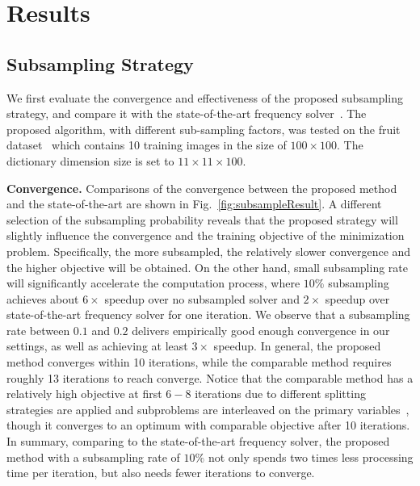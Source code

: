 \section{Results} \label{sec:result}
\subsection{Subsampling Strategy}
We first evaluate the convergence and effectiveness of the proposed subsampling strategy, and compare it with the state-of-the-art frequency solver~\cite{heide2015fast}. The proposed algorithm, with different sub-sampling factors, was tested on the fruit dataset~\cite{zeiler2010deconvolutional} which contains 10 training images in the size of $100 \times 100$. The dictionary dimension size is set to $11 \times 11 \times 100$.

{\bfseries Convergence.} Comparisons of the convergence between the proposed method and the state-of-the-art are shown in Fig.~\ref{fig:subsampleResult}. A different selection of the subsampling probability reveals that the proposed strategy will slightly influence the convergence and the training objective of the minimization problem. Specifically, the more subsampled, the relatively slower convergence and the higher objective will be obtained. On the other hand, small subsampling rate will significantly accelerate the computation process, where $10\%$ subsampling achieves about $6 \times$ speedup over no subsampled solver and $2 \times$ speedup over state-of-the-art frequency solver for one iteration. We observe that a subsampling rate between $0.1$ and $0.2$ delivers empirically good enough convergence in our settings, as well as achieving at least $3 \times$ speedup. In general, the proposed method converges within 10 iterations, while the comparable method requires roughly 13 iterations to reach converge. Notice that the comparable method has a relatively high objective at first $6-8$ iterations due to different splitting strategies are applied and subproblems are interleaved on the primary variables~\cite{wohlberg2016efficient}, though it converges to an optimum with comparable objective after 10 iterations. In summary, comparing to the state-of-the-art frequency solver, the proposed method with a subsampling rate of $10\%$ not only spends two times less processing time per iteration, but also needs fewer iterations to converge.

